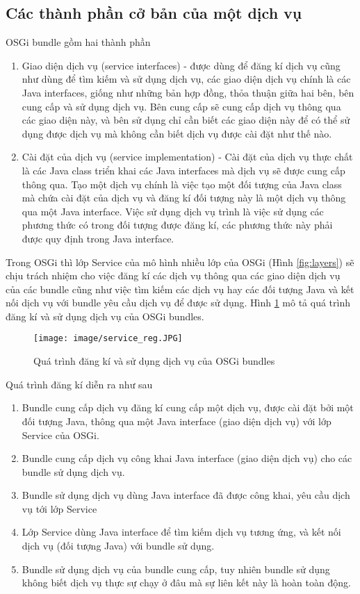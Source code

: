 \subsection{Các thành phần cở bản của một dịch vụ}
OSGi bundle gồm hai thành phần 
\begin{enumerate}
\item Giao diện dịch vụ (service interfaces) - được dùng để đăng kí dịch vụ cũng như dùng để tìm kiếm và sử dụng dịch vụ, các giao diện dịch vụ chính là các Java interfaces, giống như những bản hợp đồng, thỏa thuận giữa hai bên, bên cung cấp và sử dụng dịch vụ. Bên cung cấp sẽ cung cấp dịch vụ thông qua các giao diện này, và bên sử dụng chỉ cần biết các giao diện này để có thể sử dụng được dịch vụ mà không cần biết dịch vụ được cài đặt như thế nào.
\item Cài đặt của dịch vụ (service implementation) - Cài đặt của dịch vụ thực chất là các Java class triển khai các Java interfaces mà dịch vụ sẽ được cung cấp thông qua. Tạo một dịch vụ chính là việc tạo một đối tượng của Java class mà chứa cài đặt của dịch vụ và đăng kí đối tượng này là một dịch vụ thông qua một Java interface. Việc sử dụng dịch vụ trình là việc sử dụng các phương thức có trong đối tượng được đăng kí, các phương thức này phải được quy định trong Java interface.
\end{enumerate} 

Trong OSGi thì lớp Service của mô hình nhiều lớp của OSGi (Hình \ref{fig:layers}) sẽ chịu trách nhiệm cho việc đăng kí các dịch vụ thông qua các giao diện dịch vụ của các bundle cũng như việc tìm kiếm các dịch vụ hay các đối tượng Java và kết nối dịch vụ với bundle yêu cầu dịch vụ để được sử dụng.
Hình \ref{fig:service_reg} mô tả quá trình đăng kí và sử dụng dịch vụ của OSGi bundles.
\begin{figure}[htbp]
	\centering
		\texttt{[image: image/service\_reg.JPG]}
	\caption{Quá trình đăng kí và sử dụng dịch vụ của OSGi bundles}
	\label{fig:service_reg}
\end{figure}

Quá trình đăng kí diễn ra như sau 
\begin{enumerate}
\item Bundle cung cấp dịch vụ đăng kí cung cấp một dịch vụ, được cài đặt bởi một đối tượng Java, thông qua một Java interface (giao diện dịch vụ) với lớp Service của OSGi.
\item Bundle cung cấp dịch vụ công khai Java interface (giao diện dịch vụ) cho các bundle sử dụng dịch vụ.
\item Bundle sử dụng dịch vụ dùng Java interface đã được công khai, yêu cầu dịch vụ tới lớp Service
\item Lớp Service dùng Java interface để tìm kiếm dịch vụ tương ứng, và kết nối dịch vụ (đối tượng Java) với bundle sử dụng.
\item Bundle sử dụng dịch vụ của bundle cung cấp, tuy nhiên bundle sử dụng không biết dịch vụ thực sự chạy ở đâu mà sự liên kết này là hoàn toàn động.
\end{enumerate} 


